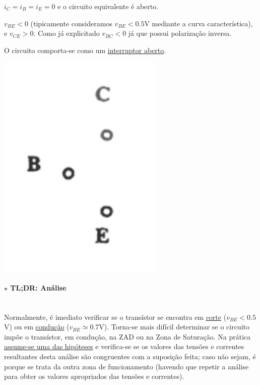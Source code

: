 \vspace{-1.25em}
\begin{center}
    \begin{minipage}{0.65\linewidth}
        $i_C = i_B = i_E = 0$ e o circuito equivalente é aberto.
        
        $v_{BE} < 0$ (tipicamente consideramos $v_{BE} < 0.5$V mediante a curva característica), e $v_{CE} > 0$. Como já explicitado $v_{BC} < 0$ já que possui polarização inversa.

        O circuito comporta-se como um \underline{interruptor aberto}.
    \end{minipage}%
    \qquad
    \begin{minipage}{0.25\linewidth}
        \begin{center}
            \includegraphics[width=0.6\textwidth]{img/3/BJT/cutoff.png}
            \label{img:cutoff-BJT}
        \end{center}
    \end{minipage}
\end{center}


\vspace{-2.0em}
\paragraph[3.1.1.4 TL;DR: Análise]{$\pmb{\star}$ TL;DR: Análise}\mbox{}\\[4pt]
Normalmente, é imediato verificar se o transístor se encontra em \underline{corte} ($v_\textit{BE} < 0.5$V) ou em \underline{condução} ($v_\textit{BE} \simeq 0.7$V). Torna-se mais difícil determinar se o circuito impõe o transístor, em condução, na ZAD ou na Zona de Saturação. Na prática \underline{assume-se uma das hipóteses} e verifica-se se os valores das tensões e correntes resultantes desta análise são congruentes com a suposição feita; caso não sejam, é porque se trata da outra zona de funcionamento (havendo que repetir a análise para obter os valores apropriados das tensões e correntes).

